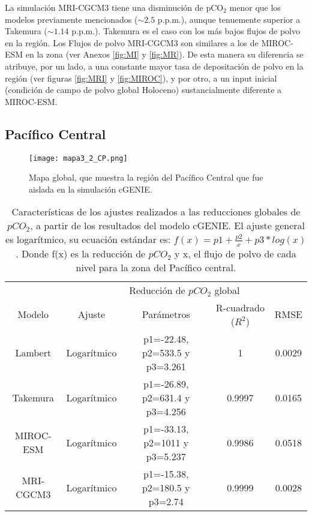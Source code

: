La simulación MRI-CGCM3 tiene una disminución de pCO$_2$ menor que los modelos previamente mencionados ($\sim 2.5$ p.p.m.), aunque tenuemente superior a Takemura ($\sim 1.14$ p.p.m.). Takemura es el caso con los más bajos flujos de polvo en la región. Los Flujos de polvo MRI-CGCM3 son similares a los de MIROC-ESM en la zona (ver Anexos \ref{fig:MI} y \ref{fig:MR}). De esta manera su diferencia se atribuye, por un lado, a una constante mayor tasa de depositación de polvo en la región (ver figuras \ref{fig:MRI} y \ref{fig:MIROC}), y por otro, a un input inicial (condición de campo de polvo global Holoceno) sustancialmente diferente a MIROC-ESM. 


\subsection{Pac\'ifico Central}

\begin{figure}[H]
\centering
 \texttt{[image: mapa3\_2\_CP.png]}
 \caption[Figura región del Pacífico Central]{Mapa global, que muestra la región del Pacífico Central que fue aislada en la simulación cGENIE.}
  \label{fig:Mapa_CP}
\end{figure}
\newpage

\begin{table}[H]
\centering
\begin{tabular}{|c|c|c|c|c|}
\hline
& \multicolumn{4}{c|}{Reducci\'on de $pCO_2$ global} \\
\cline{2-5}
Modelo& Ajuste & Par\'ametros & R-cuadrado ($R^2$) & RMSE\\
\hline \hline
Lambert  & Logar\'itmico  & p1=-22.48, p2=533.5 y p3=3.261 & 1 & 0.0029 \\ \hline
Takemura & Logar\'itmico & p1=-26.89, p2=631.4 y p3=4.256 & 0.9997 & 0.0165\\ \hline
MIROC-ESM & Logar\'itmico & p1=-33.13, p2=1011 y p3=5.237 & 0.9986 & 0.0518\\ \hline
MRI-CGCM3 & Logar\'itmico & p1=-15.38, p2=180.5 y p3=2.74 & 0.9999 & 0.0028\\ \hline
\end{tabular}
\caption[Coeficientes de ajuste CP]{Caracter\'isticas de los ajustes realizados a las reducciones globales de $pCO_2$, a partir de los resultados del modelo cGENIE. El ajuste general es logar\'itmico, 
su ecuaci\'on est\'andar es: $ f(x)=p1 + \frac{p2}{x} + p3*log(x)$. Donde f(x) es la reducci\'on de $pCO_2$ y x, el flujo de polvo de cada nivel para la zona del Pacífico central.}
\label{tabla:Res3}
\end{table}

